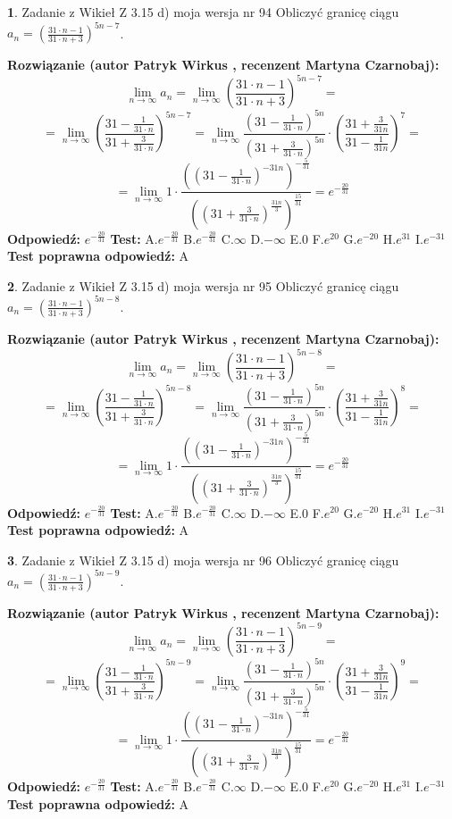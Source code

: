 \documentclass[12pt, a4paper]{article}
\theoremstyle{definition} %
\newtheorem{zad}{}
\newcommand{\zadStart}[1]{\begin{zad}#1\newline}
\newcommand{\zadStop}{\end{zad}}
\newcommand{\rozwStart}[2]{\noindent \textbf{Rozwiązanie (autor #1 , recenzent #2): }\newline}
\newcommand{\rozwStop}{\newline}
\newcommand{\odpStart}{\noindent \textbf{Odpowiedź:}\newline}
\newcommand{\odpStop}{\newline}
\newcommand{\testStart}{\noindent \textbf{Test:}\newline}
\newcommand{\testStop}{\newline}
\newcommand{\kluczStart}{\noindent \textbf{Test poprawna odpowiedź:}\newline}
\newcommand{\kluczStop}{\newline}
\begin{document}
\zadStart{Zadanie z Wikieł Z 3.15 d) moja wersja nr 94}
Obliczyć granicę ciągu $a_{n}=(\frac{31\cdot n - 1}{31 \cdot n + 3})^{5n-7}$.
\zadStop
\rozwStart{Patryk Wirkus}{Martyna Czarnobaj}
$$\lim\limits_{n\to\infty} a_{n} = \lim\limits_{n\to\infty}(\frac{31\cdot n - 1}{31 \cdot n + 3})^{5n-7}=$$
$$=\lim\limits_{n\to\infty}(\frac{31 - \frac{1}{31\cdot n}}{31 + \frac{3}{31 \cdot n}})^{5n-7}=\lim\limits_{n\to\infty}\frac{(31 - \frac{1}{31\cdot n})^{5n}}{(31 + \frac{3}{31\cdot n})^{5n}} \cdot (\frac{31+\frac{3}{31n}}{31-\frac{1}{31n}})^{7}=$$
$$=\lim\limits_{n\to\infty} 1 \cdot \frac{((31-\frac{1}{31 \cdot n})^{-31n})^{-\frac{5}{31}}}{((31+\frac{3}{31 \cdot n})^{\frac{31n}{3}})^{\frac{15}{31}}} =e^{-\frac{20}{31}}$$
\rozwStop
\odpStart
$e^{-\frac{20}{31}}$
\odpStop
\testStart
A.$ e^{-\frac{20}{31}}$
B.$ e^{-\frac{20}{31}}$
C.$\infty$
D.$-\infty$
E.$0$
F.$e^{20}$
G.$e^{-20}$
H.$e^{31}$
I.$e^{-31}$
\testStop
\kluczStart
A
\kluczStop



\zadStart{Zadanie z Wikieł Z 3.15 d) moja wersja nr 95}
Obliczyć granicę ciągu $a_{n}=(\frac{31\cdot n - 1}{31 \cdot n + 3})^{5n-8}$.
\zadStop
\rozwStart{Patryk Wirkus}{Martyna Czarnobaj}
$$\lim\limits_{n\to\infty} a_{n} = \lim\limits_{n\to\infty}(\frac{31\cdot n - 1}{31 \cdot n + 3})^{5n-8}=$$
$$=\lim\limits_{n\to\infty}(\frac{31 - \frac{1}{31\cdot n}}{31 + \frac{3}{31 \cdot n}})^{5n-8}=\lim\limits_{n\to\infty}\frac{(31 - \frac{1}{31\cdot n})^{5n}}{(31 + \frac{3}{31\cdot n})^{5n}} \cdot (\frac{31+\frac{3}{31n}}{31-\frac{1}{31n}})^{8}=$$
$$=\lim\limits_{n\to\infty} 1 \cdot \frac{((31-\frac{1}{31 \cdot n})^{-31n})^{-\frac{5}{31}}}{((31+\frac{3}{31 \cdot n})^{\frac{31n}{3}})^{\frac{15}{31}}} =e^{-\frac{20}{31}}$$
\rozwStop
\odpStart
$e^{-\frac{20}{31}}$
\odpStop
\testStart
A.$ e^{-\frac{20}{31}}$
B.$ e^{-\frac{20}{31}}$
C.$\infty$
D.$-\infty$
E.$0$
F.$e^{20}$
G.$e^{-20}$
H.$e^{31}$
I.$e^{-31}$
\testStop
\kluczStart
A
\kluczStop



\zadStart{Zadanie z Wikieł Z 3.15 d) moja wersja nr 96}
Obliczyć granicę ciągu $a_{n}=(\frac{31\cdot n - 1}{31 \cdot n + 3})^{5n-9}$.
\zadStop
\rozwStart{Patryk Wirkus}{Martyna Czarnobaj}
$$\lim\limits_{n\to\infty} a_{n} = \lim\limits_{n\to\infty}(\frac{31\cdot n - 1}{31 \cdot n + 3})^{5n-9}=$$
$$=\lim\limits_{n\to\infty}(\frac{31 - \frac{1}{31\cdot n}}{31 + \frac{3}{31 \cdot n}})^{5n-9}=\lim\limits_{n\to\infty}\frac{(31 - \frac{1}{31\cdot n})^{5n}}{(31 + \frac{3}{31\cdot n})^{5n}} \cdot (\frac{31+\frac{3}{31n}}{31-\frac{1}{31n}})^{9}=$$
$$=\lim\limits_{n\to\infty} 1 \cdot \frac{((31-\frac{1}{31 \cdot n})^{-31n})^{-\frac{5}{31}}}{((31+\frac{3}{31 \cdot n})^{\frac{31n}{3}})^{\frac{15}{31}}} =e^{-\frac{20}{31}}$$
\rozwStop
\odpStart
$e^{-\frac{20}{31}}$
\odpStop
\testStart
A.$ e^{-\frac{20}{31}}$
B.$ e^{-\frac{20}{31}}$
C.$\infty$
D.$-\infty$
E.$0$
F.$e^{20}$
G.$e^{-20}$
H.$e^{31}$
I.$e^{-31}$
\testStop
\kluczStart
A
\kluczStop
\end{document}
